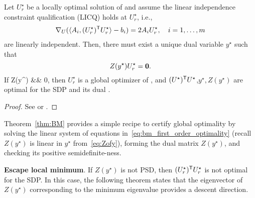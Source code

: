 \begin{theorem}\label{thm:BM}
    Let $U_r^{\star}$ be a locally optimal solution of  and assume the linear independence constraint qualification (LICQ) holds at $U^{\star}_r$, i.e.,
\begin{align}
\nabla_U (\langle A_i, (U^{\star}_r)^{\mathsf{T}} U^{\star}_r \rangle - b_i) = 2A_i U^{\star}_r, \quad i = 1, \ldots, m
\end{align}
are linearly independent. Then, there must exist a unique dual variable $y^{\star}$ such that
\begin{equation}\label{eq:bm_first_order_optimality}
Z(y^{\star})U^{\star}_r = {\mathbf 0}.
\end{equation}
If
\bea
Z(y^{\star}) &\succeq& 0,
\eea
then $U^{\star}_r$ is a global optimizer of , and $(U^{\star})^{\mathsf{T}} U^{\star}$,$y^{\star}, Z(y^{\star})$ are optimal for the SDP  and its dual .
\end{theorem}
\begin{proof}
    See \cite{burer2003nonlinear} or \cite{yang24book-sdp}.
\end{proof}

Theorem~\ref{thm:BM} provides a simple recipe to certify global optimality by solving the linear system of equations in~\eqref{eq:bm_first_order_optimality} (recall $Z(y^\star)$ is linear in $y^\star$ from~\eqref{eq:Zofy}), forming the dual matrix $Z(y^\star)$, and checking its positive semidefinite-ness. 


\textbf{Escape local minimum}. If $Z(y^\star)$ is not PSD, then $(U_r^\star)^{\mathsf{T}} U_r^\star$ is not optimal for the SDP. In this case, the following theorem states that the eigenvector of $Z(y^\star)$ corresponding to the minimum eigenvalue provides a descent direction.






